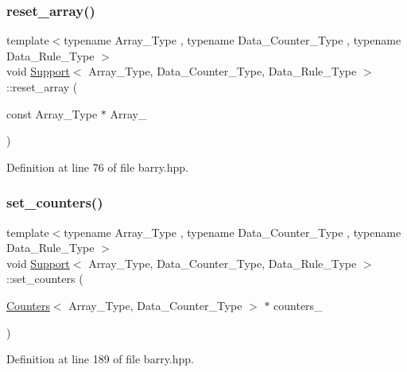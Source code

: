 \subsubsection{\texorpdfstring{reset\+\_\+array()}{reset\_array()}\hspace{0.1cm}{\footnotesize\ttfamily [2/2]}}
{\footnotesize\ttfamily template$<$typename Array\+\_\+\+Type , typename Data\+\_\+\+Counter\+\_\+\+Type , typename Data\+\_\+\+Rule\+\_\+\+Type $>$ \\
void \hyperlink{classbarry_1_1_support}{Support}$<$ Array\+\_\+\+Type, Data\+\_\+\+Counter\+\_\+\+Type, Data\+\_\+\+Rule\+\_\+\+Type $>$\+::reset\+\_\+array (\begin{DoxyParamCaption}\item[{const Array\+\_\+\+Type $\ast$}]{Array\+\_\+ }\end{DoxyParamCaption})\hspace{0.3cm}{\ttfamily [inline]}}



Definition at line 76 of file barry.\+hpp.

\mbox{\label{classbarry_1_1_support_aef83474cda55c4ed52e313e8ed948b08}} 
\subsubsection{\texorpdfstring{set\+\_\+counters()}{set\_counters()}}
{\footnotesize\ttfamily template$<$typename Array\+\_\+\+Type , typename Data\+\_\+\+Counter\+\_\+\+Type , typename Data\+\_\+\+Rule\+\_\+\+Type $>$ \\
void \hyperlink{classbarry_1_1_support}{Support}$<$ Array\+\_\+\+Type, Data\+\_\+\+Counter\+\_\+\+Type, Data\+\_\+\+Rule\+\_\+\+Type $>$\+::set\+\_\+counters (\begin{DoxyParamCaption}\item[{\hyperlink{classbarry_1_1_counters}{Counters}$<$ Array\+\_\+\+Type, Data\+\_\+\+Counter\+\_\+\+Type $>$ $\ast$}]{counters\+\_\+ }\end{DoxyParamCaption})\hspace{0.3cm}{\ttfamily [inline]}}



Definition at line 189 of file barry.\+hpp.

\mbox{\label{classbarry_1_1_support_a66dc1a0e7097d547ea9c84df777ad477}} 

